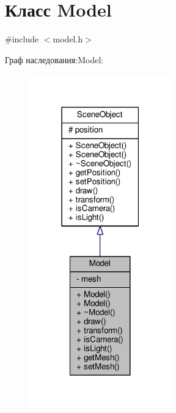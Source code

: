 \hypertarget{class_model}{}\section{Класс Model}
\label{class_model}


{\ttfamily \#include $<$model.\+h$>$}



Граф наследования\+:Model\+:
\nopagebreak
\begin{figure}[H]
\begin{center}
\leavevmode
\includegraphics[width=174pt]{dd/dc7/class_model__inherit__graph}
\end{center}
\end{figure}


